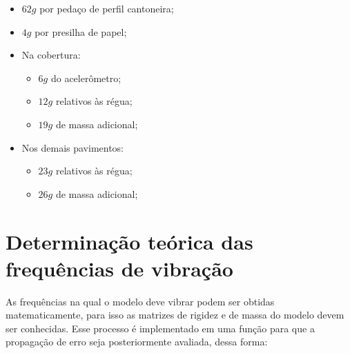 \begin{itemize}
\item
  \(62g\) por pedaço de perfil cantoneira;
\item
  \(4g\) por presilha de papel;
\item
  Na cobertura:

  \begin{itemize}
  \item
    \(6g\) do acelerômetro;
  \item
    \(12g\) relativos às régua;
  \item
    \(19g\) de massa adicional;
  \end{itemize}
\item
  Nos demais pavimentos:

  \begin{itemize}
  \item
    \(23g\) relativos às régua;
  \item
    \(26g\) de massa adicional;
  \end{itemize}
\end{itemize}

    \hypertarget{determinauxe7uxe3o-teuxf3rica-das-frequuxeancias-de-vibrauxe7uxe3o}{%
\section{Determinação teórica das frequências de
vibração}\label{determinauxe7uxe3o-teuxf3rica-das-frequuxeancias-de-vibrauxe7uxe3o}}

As frequências na qual o modelo deve vibrar podem ser obtidas
matematicamente, para isso as matrizes de rigidez e de massa do modelo
devem ser conhecidas. Esse processo é implementado em uma função para
que a propagação de erro seja posteriormente avaliada, dessa forma:

